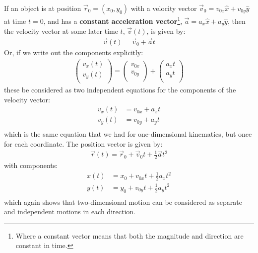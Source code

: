 If an object is at position $\vec r_0=(x_0,y_0)$ with a velocity vector $\vec v_0=v_{0x}\hat x + v_{0y}\hat y$ at time $t=0$, and has a \textbf{constant acceleration vector}\footnote{Where a constant vector means that both the magnitude and direction are constant in time.}, $\vec a = a_x\hat x+a_y\hat y$, then the velocity vector at some later time $t$, $\vec v(t)$, is given by:
\begin{align*}
\vec v(t) = \vec v_0 + \vec a t
\end{align*}
Or, if we write out the components explicitly:
\begin{align*}
\begin{pmatrix}
           v_x(t) \\
           v_y(t) \\
         \end{pmatrix} = \begin{pmatrix}
           v_{0x} \\
           v_{0y} \\
         \end{pmatrix} + \begin{pmatrix}
           a_xt \\
           a_yt \\
         \end{pmatrix}
\end{align*}
these be considered as two independent equations for the components of the velocity vector:
\begin{align*}
v_x(t)&=v_{0x}+a_xt \\
v_y(t)&=v_{0y}+a_yt \\
\end{align*}
which is the same equation that we had for one-dimensional kinematics, but once for each coordinate. The position vector is given by:
\begin{align*}
\vec r(t) = \vec r_0 + \vec v_0 t + \frac{1}{2} \vec at^2
\end{align*}
with components:
\begin{align*}
x(t) &= x_0+v_{0x}t+\frac{1}{2}a_xt^2\\
y(t) &= y_0+v_{0y}t+\frac{1}{2}a_yt^2\\
\end{align*}
which again shows that two-dimensional motion can be considered as separate and independent motions in each direction.

